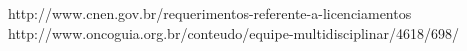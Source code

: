 \documentclass[
	12pt,				%
    oneside,			%
	a4paper,			%
	english,			%
	french,				%
	spanish,			%
	brazil,				%
	]{abntex2}
\begin{document}












\printindex

http://www.cnen.gov.br/requerimentos-referente-a-licenciamentos
http://www.oncoguia.org.br/conteudo/equipe-multidisciplinar/4618/698/


\end{document}
